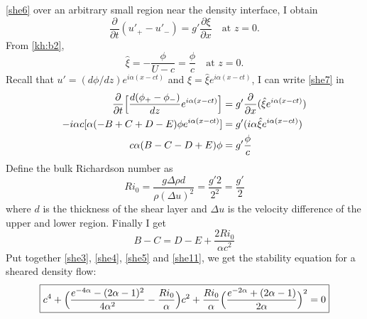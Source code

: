 \eqref{she6} over an arbitrary small region near the density
interface, I obtain
\begin{equation}\label{she7}
    \frac{\partial}{\partial t}(u'_+-u'_-)= g'\frac{\partial \xi}{\partial
    x}\quad \text{at $z=0$.}
\end{equation}
From \eqref{kh:b2},
\begin{equation}\label{she8}
\hat{\xi}=-\frac{\phi}{U-c}=\frac{\phi}{c}\quad\text{at $z=0$.}
\end{equation}
Recall that $u'=(d\phi/dz) e^{i\alpha( x - ct)}$ and $\xi=\hat\xi
e^{i\alpha( x - ct)}$, I can write \eqref{she7} in
\begin{align*}
    \frac{\partial}{\partial t}\Bigl[\frac{d(\phi_+-\phi_-)}{dz}e^{i\alpha( x - ct)}\Bigr]
    &= g'\frac{\partial}{\partial
    x}(\hat\xi e^{i\alpha( x - ct)})\\
    -i\alpha c[\alpha(-B+C+D-E)\phi e^{i\alpha( x - ct)}]
    &= g'(i\alpha\hat\xi e^{i\alpha( x - ct)})\\
    c\alpha(B-C-D+E)\phi &= g'\frac{\phi}{c}
\end{align*}
Define the bulk Richardson number as
\begin{equation}\label{she10}
    Ri_0=\frac{g\Delta\rho d}{\rho(\Delta u)^2}=\frac{g' 2}{2^2}=\frac{g'}{2}
\end{equation}
where $d$ is the thickness of the shear layer and $\Delta u$ is the
velocity difference of the upper and lower region. Finally I get
\begin{equation}\label{she11}
    B-C=D-E+\frac{2Ri_0}{\alpha c^2}
\end{equation}
Put together \eqref{she3}, \eqref{she4}, \eqref{she5} and
\eqref{she11}, we get the stability equation for a sheared density
flow:
\begin{equation}\label{she12}
\boxed{c^4+\Bigl(\frac{e^{-4\alpha}-(2\alpha-1)^2}{4\alpha^2}-\frac{Ri_0}{\alpha}\Bigr)c^2
+\frac{Ri_0}{\alpha}\Bigl(\frac{e^{-2\alpha}+(2\alpha-1)}{2\alpha}\Bigr)^2=0}
\end{equation}


